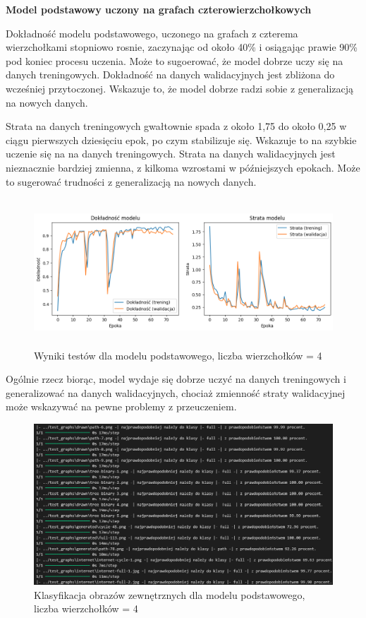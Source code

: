 \textbf{Model podstawowy uczony na grafach czterowierzchołkowych}

Dokładność modelu podstawowego, uczonego na grafach z czterema wierzchołkami stopniowo rosnie,
zaczynając od około 40\% i osiągając prawie 90\% pod koniec procesu uczenia.
Może to sugoerować, że model dobrze uczy się na danych treningowych.
Dokładność na danych walidacyjnych jest zbliżona do wcześniej przytoczonej.
Wskazuje to, że model dobrze radzi sobie z generalizacją na nowych danych.

Strata na danych treningowych gwałtownie spada z około 1,75 do około 0,25 w ciągu pierwszych dziesięciu epok,
po czym stabilizuje się.
Wskazuje to na szybkie uczenie się na na danych treningowych.
Strata na danych walidacyjnych jest nieznacznie bardziej zmienna,
z kilkoma wzrostami w późniejszych epokach.
Może to sugerować trudności z generalizacją na nowych danych.

\begin{figure}[ht]
	\centering
	\includegraphics[height=5.5cm]{resources/tests/images/v3/base4_img.png}
	\caption{Wyniki testów dla modelu podstawowego, liczba wierzchołków = 4}
	\label{Fig:tests-base-1a}
\end{figure}
\FloatBarrier

Ogólnie rzecz biorąc, model wydaje się dobrze uczyć na danych treningowych i generalizować na danych walidacyjnych,
chociaż zmienność straty walidacyjnej może wskazywać na pewne problemy z przeuczeniem.

\begin{figure}[ht]
	\centering
	\includegraphics[width=14cm]{resources/tests/images/v3/base4_txt.png}
	\caption{Klasyfikacja obrazów zewnętrznych dla modelu podstawowego, liczba wierzchołków = 4}
	\label{Fig:tests-base-1b}
\end{figure}
\FloatBarrier

